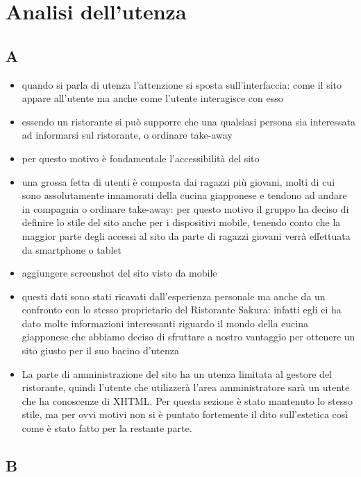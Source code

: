 \documentclass[../relazione.tex]{subfiles}
\begin{document}
\section{Analisi dell'utenza}
	\subsection{A}
	\begin{itemize}
		\item quando si parla di utenza l'attenzione si sposta sull'interfaccia: come il sito appare all'utente ma anche come l'utente interagisce con esso
		\item essendo un ristorante si può supporre che una qualsiasi persona sia interessata ad informarsi sul ristorante, o ordinare take-away
		\item per questo motivo è fondamentale l'accessibilità del sito
		\item una grossa fetta di utenti è composta dai ragazzi più giovani, molti di cui sono assolutamente innamorati della cucina giapponese e tendono ad andare in compagnia o ordinare take-away: per questo motivo il gruppo ha deciso di definire lo stile del sito anche per i dispositivi mobile, tenendo conto che la maggior parte degli accessi al sito da parte di ragazzi giovani verrà effettuata da smartphone o tablet
		\item aggiungere screenshot del sito visto da mobile
		\item questi dati sono stati ricavati dall'esperienza personale ma anche da un confronto con lo stesso proprietario del Ristorante Sakura: infatti egli ci ha dato molte informazioni interessanti riguardo il mondo della cucina giapponese che abbiamo deciso di sfruttare a nostro vantaggio per ottenere un sito giusto per il suo bacino d'utenza
		\item La parte di amministrazione del sito ha un utenza limitata al gestore del ristorante, quindi l'utente che utilizzerà l'area amministratore sarà un utente che ha conoscenze di XHTML. Per questa sezione è stato mantenuto lo stesso stile, ma per ovvi motivi non si è puntato fortemente il dito sull'estetica così come è stato fatto per la restante parte. 
	\end{itemize}

	\subsection{B}
\end{document}
